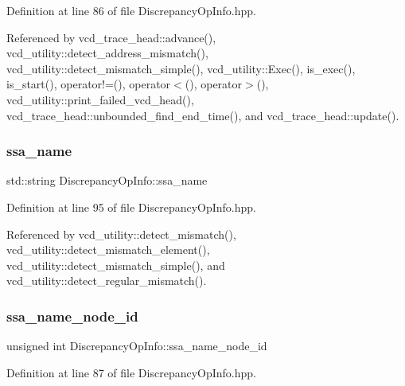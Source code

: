 Definition at line 86 of file Discrepancy\+Op\+Info.\+hpp.



Referenced by vcd\+\_\+trace\+\_\+head\+::advance(), vcd\+\_\+utility\+::detect\+\_\+address\+\_\+mismatch(), vcd\+\_\+utility\+::detect\+\_\+mismatch\+\_\+simple(), vcd\+\_\+utility\+::\+Exec(), is\+\_\+exec(), is\+\_\+start(), operator!=(), operator$<$(), operator$>$(), vcd\+\_\+utility\+::print\+\_\+failed\+\_\+vcd\+\_\+head(), vcd\+\_\+trace\+\_\+head\+::unbounded\+\_\+find\+\_\+end\+\_\+time(), and vcd\+\_\+trace\+\_\+head\+::update().

\mbox{\label{classDiscrepancyOpInfo_a93148e45bc36148dc7640125dc13a348}} 
\subsubsection{\texorpdfstring{ssa\+\_\+name}{ssa\_name}}
{\footnotesize\ttfamily std\+::string Discrepancy\+Op\+Info\+::ssa\+\_\+name}



Definition at line 95 of file Discrepancy\+Op\+Info.\+hpp.



Referenced by vcd\+\_\+utility\+::detect\+\_\+mismatch(), vcd\+\_\+utility\+::detect\+\_\+mismatch\+\_\+element(), vcd\+\_\+utility\+::detect\+\_\+mismatch\+\_\+simple(), and vcd\+\_\+utility\+::detect\+\_\+regular\+\_\+mismatch().

\mbox{\label{classDiscrepancyOpInfo_a5e8101913bea1a5937a8fa1dbbae13f0}} 
\subsubsection{\texorpdfstring{ssa\+\_\+name\+\_\+node\+\_\+id}{ssa\_name\_node\_id}}
{\footnotesize\ttfamily unsigned int Discrepancy\+Op\+Info\+::ssa\+\_\+name\+\_\+node\+\_\+id}



Definition at line 87 of file Discrepancy\+Op\+Info.\+hpp.



